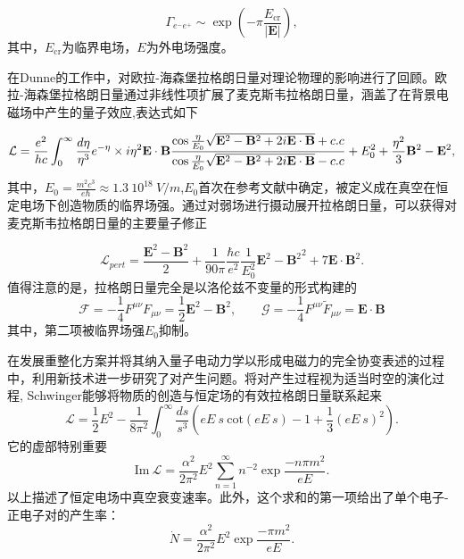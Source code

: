 \begin{equation}
    \mathcal{\Gamma}_{e^{-} e^{+}} \sim \exp \left(-\pi \frac{E_{\mathrm{cr}}}{|\mathbf{E}|}\right),
\end{equation}
其中，$E_{\mathrm{cr}}$为临界电场，$E$为外电场强度。

在Dunne的工作中\cite{2005L,2012L}，对欧拉-海森堡拉格朗日量对理论物理的影响进行了回顾。欧拉-海森堡拉格朗日量通过非线性项扩展了麦克斯韦拉格朗日量，涵盖了在背景电磁场中产生的量子效应,表达式如下

\begin{equation}
 \mathcal L = \frac{e^2}{h c} \int_0^{\infty} \frac{d \eta}{\eta^3} e^{-\eta} \times \\
 { i\eta^2 {\mathbf{E} \cdot \mathbf{B}} 
 \frac{\cos {\frac{\eta}{E_0} \sqrt{\mathbf{E}^2 - \mathbf{B}^2 + 2 i{\mathbf{E} \cdot \mathbf{B}} }} +c.c}{\cos {\frac{\eta}{E_0} \sqrt{\mathbf{E}^2 - \mathbf{B}^2 + 2 i {\mathbf{E} \cdot \mathbf{B}} }} -c.c}
 + E_0^2 + \frac{\eta^2}{3} {\mathbf{B}^2 - \mathbf{E}^2} },
\end{equation}
其中，$ E_0 = \frac{m^2 c^3}{e \hbar} \approx 1.3 \ 10^{18} \ V/m$,$ E_0$首次在参考文献\cite{1931s}中确定，被定义成在真空在恒定电场下创造物质的临界场强。通过对弱场进行摄动展开拉格朗日量，可以获得对麦克斯韦拉格朗日量的主要量子修正

\begin{equation}
\mathcal{L}_{pert}  = \frac{\mathbf{E}^2 - \mathbf{B}^2}{2} + \frac{1}{90 \pi} \frac{\hbar c}{e^2} \frac{1}{E_0^2} { {\mathbf E^2 - \mathbf B^2}^2 + 7 {\mathbf{E} \cdot \mathbf B}^2}.
\end{equation}
值得注意的是，拉格朗日量完全是以洛伦兹不变量的形式构建的
\begin{equation}
\mathcal F = -\frac{1}{4} F^{\mu \nu} F_{\mu \nu} = \frac{1}{2} {\mathbf{E}^2 - \mathbf{B}^2} ,\qquad \mathcal G = -\frac{1}{4} F^{\mu \nu} \tilde F_{\mu \nu} = \mathbf{E} \cdot \mathbf{B}
\end{equation}
其中，第二项被临界场强$E_0$抑制。

在发展重整化方案并将其纳入量子电动力学以形成电磁力的完全协变表述的过程中，利用新技术进一步研究了对产生问题。将对产生过程视为适当时空的演化过程\cite{1951s}, Schwinger能够将物质的创造与恒定场的有效拉格朗日量联系起来
\begin{equation}
 \mathcal L = \frac{1}{2} E^2 - \frac{1}{8 \pi^2} \int_0^{\infty} \frac{ds}{s^3} \left ( {e E \ s \ \text{cot} {\left ( e E \ s \right ) } - 1 + \frac{1}{3} {\left ( e E \ s \right ) }^2}\right ). 
\end{equation}
它的虚部特别重要
\begin{equation}
    \text{Im} \ \mathcal L = \frac{\alpha^2}{2 \pi^2} E^2 \sum_{n=1}^{\infty} n^{-2} \exp {\frac{-n \pi m^2}{e E}}.
\end{equation}
以上描述了恒定电场中真空衰变速率。此外，这个求和的第一项给出了单个电子-正电子对的产生率：
\begin {equation} \label{NS}
 \dot N = \frac{\alpha^2}{2 \pi^2} E^2 \exp {\frac{- \pi m^2}{e E}}.
\end {equation} 

